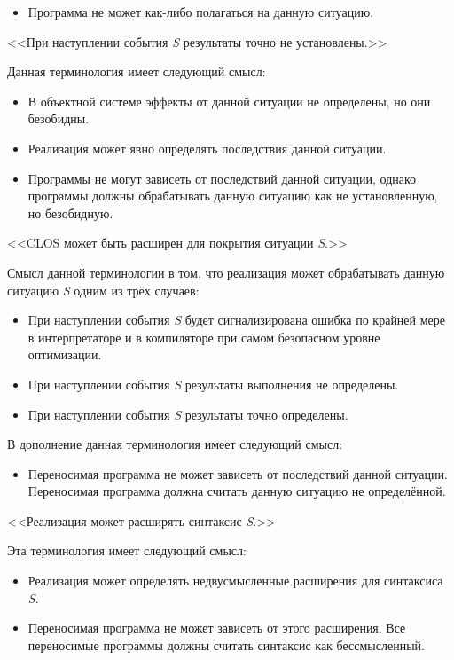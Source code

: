 \begin{flushdesc}
\begin{itemize}
  \item Программа не может как-либо полагаться на данную ситуацию.
  \end{itemize}

\item[<<При наступлении события \emph{S} результаты точно не установлены.>>]
  
Данная терминология имеет следующий смысл:

\begin{itemize}
\item В объектной системе эффекты от данной ситуации не определены, но они
  безобидны.
  
\item Реализация может явно определять последствия данной ситуации.
  
\item Программы не могут зависеть от последствий данной ситуации, однако программы
  должны обрабатывать данную ситуацию как не установленную, но безобидную.
\end{itemize}

\item[<<CLOS может быть расширен для покрытия ситуации \emph{S}.>>]

Смысл данной терминологии в том, что реализация может обрабатывать данную
ситуацию \emph{S} одним из трёх случаев:

\begin{itemize}
\item При наступлении события \emph{S} будет сигнализирована ошибка по
  крайней мере в интерпретаторе и в компиляторе при самом безопасном уровне
  оптимизации.
  
\item При наступлении события \emph{S} результаты выполнения не определены.

\item При наступлении события \emph{S} результаты точно определены.
\end{itemize}

В дополнение данная терминология имеет следующий смысл:

\begin{itemize}
\item Переносимая программа не может зависеть от последствий данной
  ситуации. Переносимая программа должна считать данную ситуацию не
  определённой.
\end{itemize}

\item[<<Реализация может расширять синтаксис \emph{S}.>>]

Эта терминология имеет следующий смысл:

\begin{itemize}
\item Реализация может определять недвусмысленные расширения для синтаксиса
  \emph{S}.

\item Переносимая программа не может зависеть от этого расширения. Все
  переносимые программы должны считать синтаксис как бессмысленный.
\end{itemize}
\end{flushdesc}

